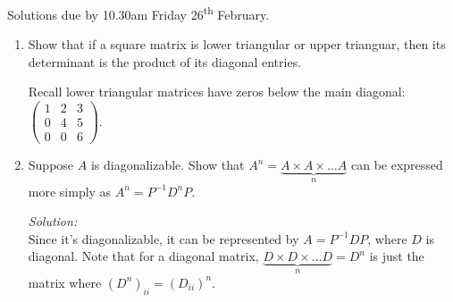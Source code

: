 \documentclass[12pt]{article}
\newif\ifsln
\newcommand{\halmos}{\hfill$\blacksquare$}
\begin{document}
\pagestyle{fancyplain}


\chead{\textbf{Tutorial 3 \ifsln Solutions \fi}}

\begin{center}
Solutions due by 10.30am Friday 26\textsuperscript{th} February.
\end{center}

\begin{enumerate}[1.]
\setlength\itemsep{5mm}
\item Show that if a square matrix is lower triangular or upper trianguar, then its determinant is the product of its diagonal entries. 

Recall lower triangular matrices have zeros below the main diagonal: $\begin{pmatrix}1 &2 & 3 \\ 0 & 4 & 5\\ 0 & 0& 6\end{pmatrix}$.

\ifsln
\textit{Solution:}\\

Prove by induction on the size of the matrix. For the base case, $n = 1$, the determinant is the product of the diagonal since there's only one entry. For the induction step, assume the proposition is true for any $(n-1)\times (n-1)$ matrix and try to show it's true for an $n\times n$ matrix. \smallskip

Let $A$ be an $n\times n$ lower triangular matrix. Expanding along the first column, $\det(A) = a_{11}M_{11}$, since $a_{j1} = 0$ for $j \geq 1$. But $M_{11}$ is the determinant of an $(n-1)\times(n-1)$ matrix. By the induction hypothesis its determinant is the product of its main diagonal which is, $M_{11} = a_{22}a_{33}...a_{nn}$. Therefore $\det(A) = a_{11}a_{22}\dots a_{nn}$.Proof for upper triangular follows by transposition. \halmos
\fi

\item Suppose $A$ is diagonalizable. Show that $A^{n} = \underbrace{A\times A \times \dots A}_{n}$ can be expressed more simply as $A^{n} = P^{-1} D^{n} P$.

\ifsln
\textit{Solution:}\\
Since it's diagonalizable, it can be represented by $A = P^{-1}DP$, where $D$ is diagonal. Note that for a diagonal matrix, $\underbrace{D\times D \times \dots D}_{n} = D^{n}$ is just the matrix where $(D^{n})_{ii} = (D_{ii})^{n}$.\smallskip


\end{enumerate}
\end{document}

